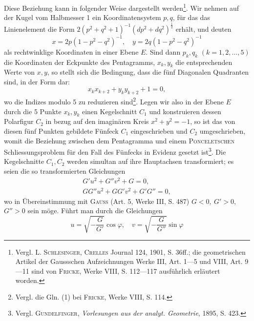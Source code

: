 \HistoricalFoot{}{25\textsuperscript{*}}
\clearpage{}
\noindent Diese Beziehung kann in folgender Weise dargestellt werden\footnote{Vergl. \textsc{L. Schlesinger}, \textsc{Crelles} Journal 124, 1901, S. 36ff.; die geometrischen Artikel der Gaussschen Aufzeichnungen Werke III, Art. 1—5 und VIII, Art. 9—11 sind von \textsc{Fricke}, Werke VIII, S. 112—117 ausführlich erläutert worden.}. Wir nehmen
auf der Kugel vom Halbmesser 1 ein Koordinatensystem \(p,q\), für das das
Linienelement die Form \(2(p^2+q^2+1)^{-1}(dp^2+dq^2)^{\frac12}\) erhält, und deuten
\[
x=2p(1-p^2-q^2)^{-1},\quad y=2q(1-p^2-q^2)^{-1}
\]
als rechtwinklige Koordinaten in einer Ebene \(E\). Sind dann \(p_k,q_k\) \((k=1,2,\ldots,5)\)
die Koordinaten der Eckpunkte des Pentagramms, \(x_k,y_k\) die entsprechenden
Werte von \(x,y\), so stellt sich die Bedingung, dass die fünf Diagonalen Quadranten
sind, in der Form dar:
\begingroup\makeatletter\tagsleft@true\let\veqno\leqno\makeatother
\begin{equation*}
x_kx_{k+2}+y_ky_{k+2}+1=0,\tag*{(1)}
\end{equation*}
\endgroup
wo die Indizes modulo 5 zu reduzieren sind\footnote{Vergl. die Gln. (1) bei \textsc{Fricke}, Werke VIII, S. 114.}. Legen wir also in der Ebene
\(E\) durch die 5 Punkte \(x_k,y_k\) einen Kegelschnitt \(C_1\) und konstruieren dessen
Polarfigur \(C_2\) in bezug auf den imaginären Kreis \(x^2+y^2=-1\), so ist das von
diesen fünf Punkten gebildete Fünfeck \(C_1\) eingeschrieben und \(C_2\) umgeschrieben,
womit die Beziehung zwischen dem Pentagramma und einem \textsc{Ponceletschen}
Schliessungsproblem für den Fall des Fünfecks in Evidenz gesetzt ist\footnote{Vergl. \textsc{Gundelfinger}, \textit{Vorlesungen aus der analyt. Geometrie}, 1895, S. 423.}. Die
Kegelschnitte \(C_1,C_2\) werden simultan auf ihre Hauptachsen transformiert; es
seien die so transformierten Gleichungen
\begingroup\makeatletter\tagsleft@true\let\veqno\leqno\makeatother
\begin{equation*}
\begin{gathered}
G'u^2+G''v^2+G=0,\\
GG''u^2+GG'v^2+G'G''=0,
\end{gathered}\tag*{(2)}
\end{equation*}
\endgroup
wo in Übereinstimmung mit \textsc{Gauss} (Art. 5, Werke III, S. 487) \(G<0,\ G'>0,\)
\(G''>0\) sein möge. Führt man durch die Gleichungen
\[
u=\sqrt{-\frac G{G'}}\cos\varphi,\quad v=\sqrt{-\frac G{G''}}\sin\varphi
\]
